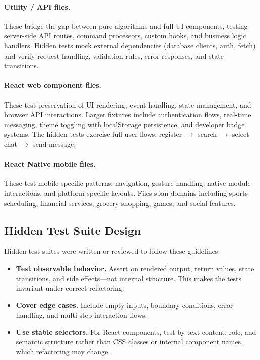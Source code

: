 \documentclass[11pt,letterpaper]{article}
\begin{document}
\paragraph{Utility / API files.} These bridge the gap between pure algorithms and full UI components, testing server-side API routes, command processors, custom hooks, and business logic handlers. Hidden tests mock external dependencies (database clients, auth, fetch) and verify request handling, validation rules, error responses, and state transitions.

\paragraph{React web component files.} These test preservation of UI rendering, event handling, state management, and browser API interactions. Larger fixtures include authentication flows, real-time messaging, theme toggling with localStorage persistence, and developer badge systems. The hidden tests exercise full user flows: register $\rightarrow$ search $\rightarrow$ select chat $\rightarrow$ send message.

\paragraph{React Native mobile files.} These test mobile-specific patterns: navigation, gesture handling, native module interactions, and platform-specific layouts. Files span domains including sports scheduling, financial services, grocery shopping, games, and social features.

\subsection{Hidden Test Suite Design}

Hidden test suites were written or reviewed to follow these guidelines:

\begin{itemize}[leftmargin=2em]
\item \textbf{Test observable behavior.} Assert on rendered output, return values, state transitions, and side effects---not internal structure. This makes the tests invariant under correct refactoring.
\item \textbf{Cover edge cases.} Include empty inputs, boundary conditions, error handling, and multi-step interaction flows.
\item \textbf{Use stable selectors.} For React components, test by text content, role, and semantic structure rather than CSS classes or internal component names, which refactoring may change.
\end{itemize}
\end{document}
